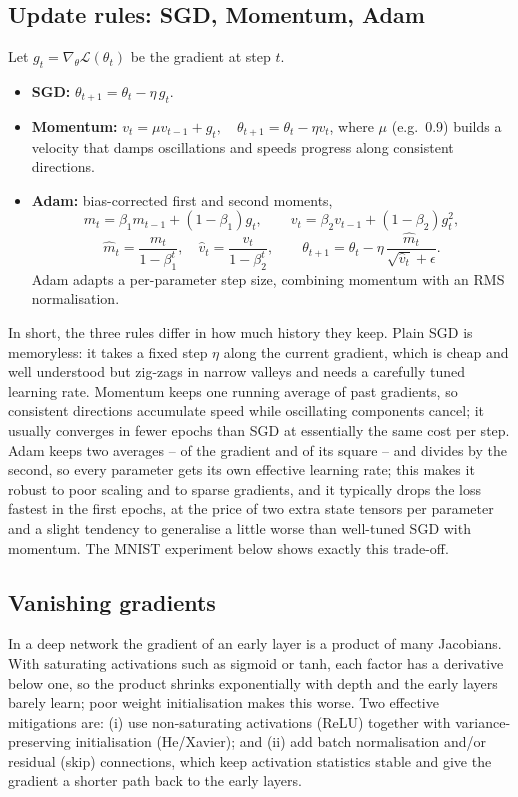 \documentclass[11pt,a4paper]{article}
\begin{document}
\subsection{Update rules: SGD, Momentum, Adam}
Let $g_t=\nabla_\theta\mathcal{L}(\theta_t)$ be the gradient at step $t$.
\begin{itemize}[nosep]
\item \textbf{SGD:} $\theta_{t+1}=\theta_t-\eta\,g_t$.
\item \textbf{Momentum:} $v_t=\mu v_{t-1}+g_t,\quad \theta_{t+1}=\theta_t-\eta v_t$, where
$\mu$ (e.g.\ 0.9) builds a velocity that damps oscillations and speeds progress along
consistent directions.
\item \textbf{Adam:} bias-corrected first and second moments,
\[
m_t=\beta_1 m_{t-1}+(1-\beta_1)g_t,\qquad v_t=\beta_2 v_{t-1}+(1-\beta_2)g_t^2,
\]
\[
\hat m_t=\frac{m_t}{1-\beta_1^{t}},\quad \hat v_t=\frac{v_t}{1-\beta_2^{t}},\qquad
\theta_{t+1}=\theta_t-\eta\,\frac{\hat m_t}{\sqrt{\hat v_t}+\epsilon}.
\]
Adam adapts a per-parameter step size, combining momentum with an RMS normalisation.
\end{itemize}

In short, the three rules differ in how much history they keep. Plain SGD is memoryless: it
takes a fixed step $\eta$ along the current gradient, which is cheap and well understood but
zig-zags in narrow valleys and needs a carefully tuned learning rate. Momentum keeps one
running average of past gradients, so consistent directions accumulate speed while
oscillating components cancel; it usually converges in fewer epochs than SGD at essentially
the same cost per step. Adam keeps two averages -- of the gradient and of its square -- and
divides by the second, so every parameter gets its own effective learning rate; this makes it
robust to poor scaling and to sparse gradients, and it typically drops the loss fastest in the
first epochs, at the price of two extra state tensors per parameter and a slight tendency to
generalise a little worse than well-tuned SGD with momentum. The MNIST experiment below shows
exactly this trade-off.

\subsection{Vanishing gradients}
In a deep network the gradient of an early layer is a product of many Jacobians. With
saturating activations such as sigmoid or tanh, each factor has a derivative below one, so
the product shrinks exponentially with depth and the early layers barely learn; poor weight
initialisation makes this worse. Two effective mitigations are: (i) use non-saturating
activations (ReLU) together with variance-preserving initialisation (He/Xavier); and
(ii) add batch normalisation and/or residual (skip) connections, which keep activation
statistics stable and give the gradient a shorter path back to the early layers.
\end{document}
